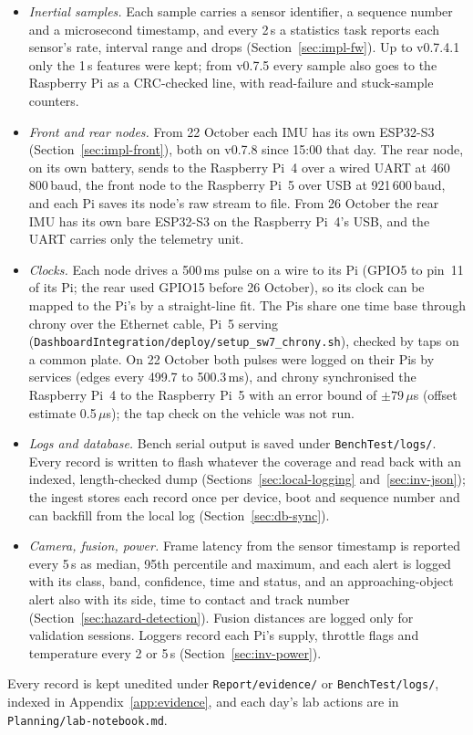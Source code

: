 \begin{itemize}
\item \emph{Inertial samples.} Each sample carries a sensor identifier, a sequence number and a microsecond timestamp, and every 2\,s a statistics task reports each sensor's rate, interval range and drops (Section~\ref{sec:impl-fw}). Up to v0.7.4.1 only the 1\,s features were kept; from v0.7.5 every sample also goes to the Raspberry Pi as a CRC-checked line, with read-failure and stuck-sample counters.
\item \emph{Front and rear nodes.} From 22 October each IMU has its own ESP32-S3 (Section~\ref{sec:impl-front}), both on v0.7.8 since 15:00 that day. The rear node, on its own battery, sends to the Raspberry Pi~4 over a wired UART at 460\,800\,baud, the front node to the Raspberry Pi~5 over USB at 921\,600\,baud, and each Pi saves its node's raw stream to file. From 26 October the rear IMU has its own bare ESP32-S3 on the Raspberry Pi~4's USB, and the UART carries only the telemetry unit.
\item \emph{Clocks.} Each node drives a 500\,ms pulse on a wire to its Pi (GPIO5 to pin~11 of its Pi; the rear used GPIO15 before 26 October), so its clock can be mapped to the Pi's by a straight-line fit. The Pis share one time base through chrony over the Ethernet cable, Pi~5 serving (\texttt{DashboardIntegration/\allowbreak{}deploy/\allowbreak{}setup\_\allowbreak{}sw7\_\allowbreak{}chrony.sh}), checked by taps on a common plate. On 22 October both pulses were logged on their Pis by services (edges every 499.7 to 500.3\,ms), and chrony synchronised the Raspberry Pi~4 to the Raspberry Pi~5 with an error bound of $\pm 79\,\mu$s (offset estimate 0.5\,$\mu$s); the tap check on the vehicle was not run.
\item \emph{Logs and database.} Bench serial output is saved under \texttt{BenchTest/logs/}. Every record is written to flash whatever the coverage and read back with an indexed, length-checked dump (Sections~\ref{sec:local-logging} and~\ref{sec:inv-json}); the ingest stores each record once per device, boot and sequence number and can backfill from the local log (Section~\ref{sec:db-sync}).
\item \emph{Camera, fusion, power.} Frame latency from the sensor timestamp is reported every 5\,s as median, 95th percentile and maximum, and each alert is logged with its class, band, confidence, time and status, and an approaching-object alert also with its side, time to contact and track number (Section~\ref{sec:hazard-detection}). Fusion distances are logged only for validation sessions. Loggers record each Pi's supply, throttle flags and temperature every 2 or 5\,s (Section~\ref{sec:inv-power}).
\end{itemize}
Every record is kept unedited under \texttt{Report/evidence/} or \texttt{BenchTest/logs/}, indexed in Appendix~\ref{app:evidence}, and each day's lab actions are in \texttt{Planning/lab-notebook.md}.

